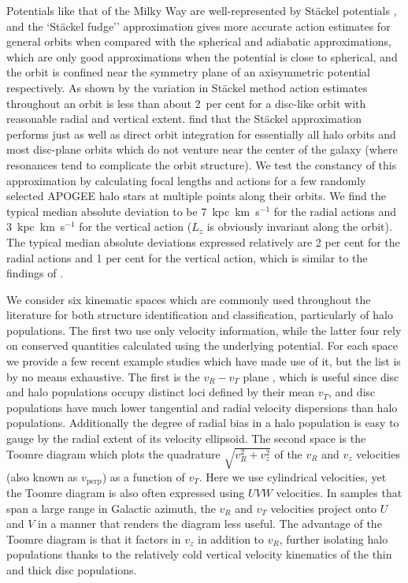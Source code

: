 Potentials like that of the Milky Way are well-represented by St\"{a}ckel potentials \citep{dejonghe88}, and the `St\"{a}ckel fudge'' approximation gives more accurate action estimates for general orbits when compared with the spherical and adiabatic approximations, which are only good approximations when the potential is close to spherical, and the orbit is confined near the symmetry plane of an axisymmetric potential respectively. As shown by \citep{bovy15} the variation in St\"{a}ckel method action estimates throughout an orbit is less than about 2~per cent for a disc-like orbit with reasonable radial and vertical extent. \citet{mackereth18c} find that the St\"{a}ckel approximation performs just as well as direct orbit integration for essentially all halo orbits and most disc-plane orbits which do not venture near the center of the galaxy (where resonances tend to complicate the orbit structure). We test the constancy of this approximation by calculating focal lengths and actions for a few randomly selected APOGEE halo stars at multiple points along their orbits. We find the typical median absolute deviation to be 7~kpc~km~s$^{-1}$ for the radial actions and 3~kpc~km~s$^{-1}$ for the vertical action ($L_{z}$ is obviously invariant along the orbit). The typical median absolute deviations expressed relatively are 2 per cent for the radial actions and 1 per cent for the vertical action, which is similar to the findings of \citet{bovy15}.

We consider six kinematic spaces which are commonly used throughout the literature for both structure identification and classification, particularly of halo populations. The first two use only velocity information, while the latter four rely on conserved quantities calculated using the underlying potential. For each space we provide a few recent example studies which have made use of it, but the list is by no means exhaustive. The first is the $v_{R}-v_{T}$ plane \citep[e.g. ][]{belokurov18, fattahi19,lancaster19,mackereth19a,belokurov20, feuillet20}, which is useful since disc and halo populations occupy distinct loci defined by their mean $v_{T}$, and disc populations have much lower tangential and radial velocity dispersions than halo populations. Additionally the degree of radial bias in a halo population is easy to gauge by the radial extent of its velocity ellipsoid. The second space is the Toomre diagram \citep[e.g. ][]{hawkins15,helmi18,koppelman19b,feuillet20,cordoni20} which plots the quadrature $\sqrt{v_R^2+v_z^2}$ of the $v_{R}$ and $v_{z}$ velocities (also known as $v_\mathrm{perp}$) as a function of $v_{T}$. Here we use cylindrical velocities, yet the Toomre diagram is also often expressed using $UVW$ velocities. In samples that span a large range in Galactic azimuth, the $v_R$ and $v_T$ velocities project onto $U$ and $V$ in a manner that renders the diagram less useful. The advantage of the Toomre diagram is that it factors in $v_{z}$ in addition to $v_{R}$, further isolating halo populations thanks to the relatively cold vertical velocity kinematics of the thin and thick disc populations.

